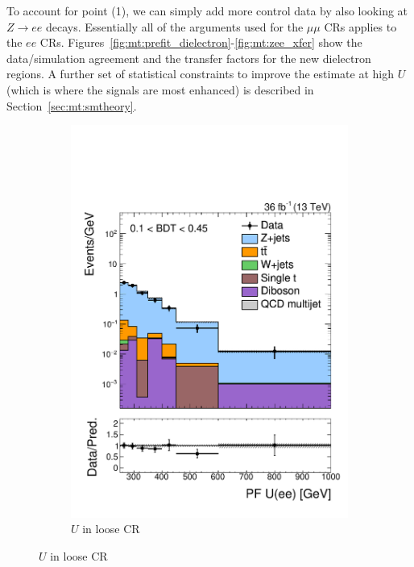 To account for point (1), we can simply add more control data by also looking at $Z\rightarrow ee$ decays. 
Essentially all of the arguments used for the $\mu\mu$ CRs applies to the $ee$ CRs. 
Figures~\ref{fig:mt:prefit_dielectron}-\ref{fig:mt:zee_xfer} show the data/simulation agreement and the transfer factors for the new dielectron regions.
A further set of statistical constraints to improve the estimate at high $U$ (which is where the signals are most enhanced) is described in Section~\ref{sec:mt:smtheory}. 

\begin{figure}[]
    \begin{center}
        \begin{subfigure}[t]{0.32\textwidth}
            \includegraphics[width=\textwidth]{figures/monotop/prefit/dielectron_loose_pfUZmag_logy.pdf}
            \caption{$U$ in loose CR}
        \end{subfigure}

\end{center}
\end{figure}
